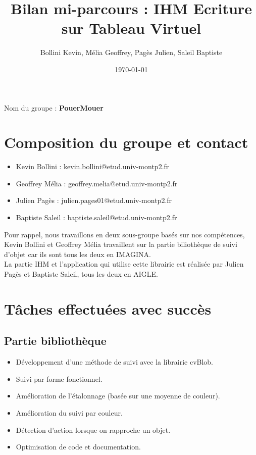 \documentclass{article}
\title{Bilan mi-parcours : IHM Ecriture sur Tableau Virtuel}
\author{Bollini Kevin, Mélia Geoffrey, Pagès Julien, Saleil Baptiste}
\date{\today}
\begin{document}
	\maketitle
	Nom du groupe : \textbf{PouerMouer}
	
	\section{Composition du groupe et contact}
	
	\begin{itemize}
	\item Kevin Bollini : kevin.bollini@etud.univ-montp2.fr \\
	\item Geoffrey Mélia : geoffrey.melia@etud.univ-montp2.fr \\
	\item Julien Pagès : julien.pages01@etud.univ-montp2.fr \\
	\item Baptiste Saleil : baptiste.saleil@etud.univ-montp2.fr \\
	\end{itemize}
	
	Pour rappel, nous travaillons en deux sous-groupe basés sur nos compétences, Kevin Bollini et Geoffrey Mélia travaillent
	sur la partie biliothèque de suivi d'objet car ils sont tous les deux en IMAGINA. \\
	La partie IHM et l'application qui utilise cette librairie est réalisée par Julien Pagès et Baptiste Saleil, tous les deux en AIGLE. \\
	\section{Tâches effectuées avec succès}
		\subsection{Partie bibliothèque}
		\begin{itemize}
		\item Développement d'une méthode de suivi avec la librairie cvBlob.
		\item Suivi par forme fonctionnel.
		\item Amélioration de l'étalonnage (basée sur une moyenne de couleur).
		\item Amélioration du suivi par couleur.
		\item Détection d'action lorsque on rapproche un objet.
		\item Optimisation de code et documentation.
		\end{itemize}
		
\end{document}
